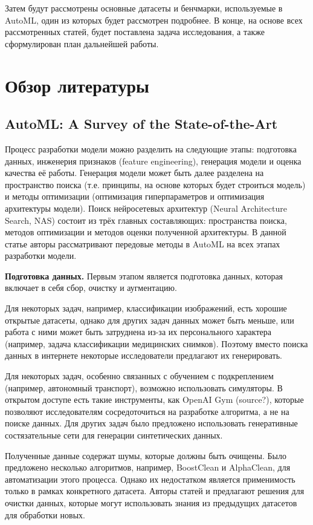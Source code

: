 \documentclass[a4paper,14pt]{extarticle}
\begin{document}
    Затем будут рассмотрены основные датасеты и бенчмарки, используемые в AutoML, один из которых будет рассмотрен подробнее.
    В конце, на основе всех рассмотренных статей, будет поставлена задача исследования, а также сформулирован план дальнейшей работы.

\newpage
\section{Обзор литературы}
\subsection{AutoML: A Survey of the State-of-the-Art}
    Процесс разработки модели можно разделить на следующие этапы: подготовка данных, инженерия признаков (feature engineering), генерация модели и оценка качества её работы.
    Генерация модели может быть далее разделена на пространство поиска (т.е. принципы, на основе которых будет строиться модель) и методы оптимизации (оптимизация гиперпараметров и оптимизация архитектуры модели).
    Поиск нейросетевых архитектур (Neural Architecture Search, NAS) состоит из трёх главных составляющих: пространства поиска, методов оптимизации и методов оценки полученной архитектуры.
    В данной статье авторы рассматривают передовые методы в AutoML на всех этапах разработки модели.

    \textbf{Подготовка данных.}
    Первым этапом является подготовка данных, которая включает в себя сбор, очистку и аугментацию.
    
    Для некоторых задач, например, классификации изображений, есть хорошие открытые датасеты, однако для других задач данных может быть меньше, или работа с ними может быть затруднена из-за их персонального характера (например, задача классификации медицинских снимков). 
    Поэтому вместо поиска данных в интернете некоторые исследователи предлагают их генерировать.

    Для некоторых задач, особенно связанных с обучением с подкреплением (например, автономный транспорт), возможно использовать симуляторы.
    В открытом доступе есть такие инструменты, как OpenAI Gym (source?), которые позволяют исследователям сосредоточиться на разработке алгоритма, а не на поиске данных.
    Для других задач было предложено использовать генеративные состязательные сети для генерации синтетических данных.

    Полученные данные содержат шумы, которые должны быть очищены. Было предложено несколько алгоритмов, например, BoostClean и AlphaClean, для автоматизации этого процесса.
    Однако их недостатком является применимость только в рамках конкретного датасета.
    Авторы статей \cite{bibl:clean1} и \cite{bibl:clean2} предлагают решения для очистки данных, которые могут использовать знания из предыдущих датасетов для обработки новых.
\end{document}

